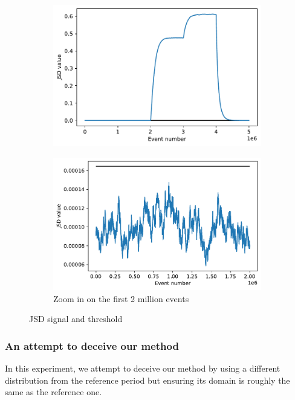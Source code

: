 \begin{figure}[!htb]
\centering
\begin{subfigure}{.5\textwidth}
  \centering
  \includegraphics[width=1\linewidth]{figures/stream-analysis-viz-test04.pdf}
  \label{fig:JSD-signal-test04}
\end{subfigure}%
\begin{subfigure}{.5\textwidth}
  \centering
  \includegraphics[width=1\linewidth]{figures/stream-analysis-viz-zoom-test04.pdf}
  \caption{Zoom in on the first 2 million events}
  \label{fig:JSD-signal-zoom-test04}
\end{subfigure}
\caption{JSD signal and threshold}
\end{figure}


\subsubsection{An attempt to deceive our method}
In this experiment, we attempt to deceive our method by using a different distribution from the reference period but ensuring its domain is roughly the same as the reference one.

